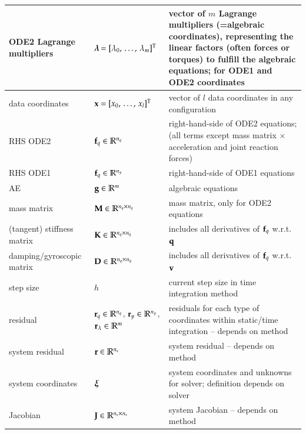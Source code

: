 \begin{center}
\begin{longtable}{| p{5cm} | p{5cm} | p{6cm} |}
    ODE2 Lagrange multipliers & $\mbox{\boldmath $\lambda$ \unboldmath}\!\! = [\lambda_0,\, \ldots,\, \lambda_m]^\mathrm{T}$ & vector of $m$ Lagrange multipliers (=algebraic coordinates), representing the linear factors (often forces or torques) to fulfill the algebraic equations; for ODE1 and ODE2 coordinates\\ \hline
    data coordinates & $\mathbf{x} = [x_0,\, \ldots,\, x_l]^\mathrm{T}$ & vector of $l$ data coordinates in any configuration\\ \hline
%
  RHS ODE2 & $\mathbf{f}_q\in \mathbb{R}^{n_q}$ & right-hand-side of ODE2 equations; (all terms except mass matrix $\times$ acceleration and joint reaction forces)\\ \hline
  RHS ODE1 & $\mathbf{f}_q\in \mathbb{R}^{n_y}$ & right-hand-side of ODE1 equations\\ \hline
  AE & $\mathbf{g}\in \mathbb{R}^{m}$ & algebraic equations\\ \hline
%
  mass matrix & $\mathbf{M}\in \mathbb{R}^{n_q \times n_q}$ & mass matrix, only for ODE2 equations\\ \hline
  (tangent) stiffness matrix & $\mathbf{K}\in \mathbb{R}^{n_q \times n_q}$ & includes all derivatives of $\mathbf{f}_q$ w.r.t.\ $\mathbf{q}$\\ \hline
  damping/gyroscopic matrix & $\mathbf{D}\in \mathbb{R}^{n_q \times n_q}$ & includes all derivatives of $\mathbf{f}_q$ w.r.t.\ $\mathbf{v}$ \\ \hline
%
  step size & $h$ & current step size in time integration method \\ \hline
  residual & $\mathbf{r}_q \in \mathbb{R}^{n_q}$, $\mathbf{r}_y \in \mathbb{R}^{n_y}$, $\mathbf{r}_\lambda \in \mathbb{R}^{m}$ & residuals for each type of coordinates within static/time integration -- depends on method\\ \hline
  system residual & $\mathbf{r}\in \mathbb{R}^{n_s}$ & system residual -- depends on method\\ \hline
  system coordinates & $\mbox{\boldmath $\xi$ \unboldmath}\!\!$ & system coordinates and unknowns for solver; definition depends on solver\\ \hline
  Jacobian & $\mathbf{J}\in \mathbb{R}^{n_s \times n_s}$ & system Jacobian -- depends on method\\ \hline

\end{longtable}
\end{center}

